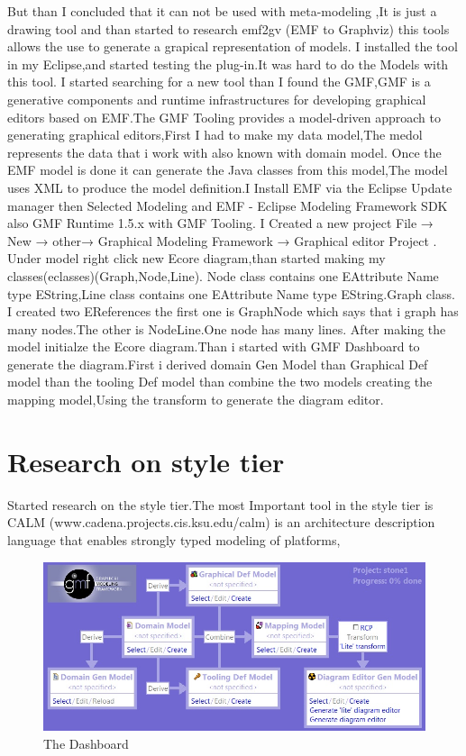 \documentclass{article}
\begin{document}
But than I concluded that it can not be used with meta-modeling ,It is just a drawing tool and than started to research emf2gv (EMF to Graphviz) this tools allows the use to generate a grapical representation of models. I installed the tool in my Eclipse,and started testing the plug-in.It was hard to do the Models with this tool.
I started searching for a new tool than I found the GMF,GMF is a generative components and runtime infrastructures for developing graphical editors based on EMF.The GMF Tooling provides a model-driven approach to generating graphical editors,First I had to make my data model,The medol represents the data that i work with also known with domain model.
Once the EMF model is done it can generate the  Java  classes from this model,The model uses XML to produce the model definition.I Install EMF via the Eclipse Update manager then Selected Modeling and EMF - Eclipse Modeling Framework SDK also GMF Runtime 1.5.x with GMF Tooling.
I Created a new project File → New → other→ Graphical Modeling Framework → Graphical editor Project .
Under model right click new Ecore diagram,than started making my classes(eclasses)(Graph,Node,Line).
Node class contains one EAttribute Name type EString,Line class contains one EAttribute Name type EString.Graph class.
I created two EReferences the first one is GraphNode which says that i graph has many nodes.The other is NodeLine.One node has many lines.
After making the model initialze the Ecore diagram.Than i started with GMF Dashboard to generate the diagram.First i derived domain Gen Model than Graphical Def model than the tooling Def model than combine the two models creating the mapping model,Using the transform to generate 
the diagram editor.

\section{Research on style tier}
Started research on the style tier.The most Important tool in the style tier is CALM (www.cadena.projects.cis.ksu.edu/calm) is an
architecture description language that enables strongly
typed modeling of platforms,\cite{Adam Childs, Jesse Greenwald, Georg Jung, Matthew Hoosier, and John Hatcliff}


\begin{figure}[htp]
\centering
\includegraphics[width=1\linewidth]{GMF Dashboard.jpg}
\caption{The Dashboard}
\label{threadsVsSync}
\end{figure}





\end{document}
